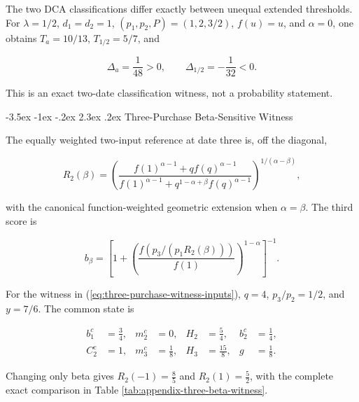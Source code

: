 \documentclass[12pt,a4paper,oneside]{report}
\makeatletter
\renewcommand\section{\@startsection{section}{1}{\z@}%
  {-3.5ex \@plus -1ex \@minus -.2ex}%
  {2.3ex \@plus .2ex}%
  {\normalfont\fontsize{14}{17}\selectfont\bfseries}}
\makeatother
\begin{document}
The two DCA classifications differ exactly between unequal extended
thresholds. For
$\lambda=1/2$, $d_1=d_2=1$, $(p_1,p_2,P)=(1,2,3/2)$,
$f(u)=u$, and $\alpha=0$, one obtains
$T_a=10/13$, $T_{1/2}=5/7$, and

\begin{equation}
  \Delta_a=\frac1{48}>0,
  \qquad
  \Delta_{1/2}=-\frac1{32}<0.
  \label{eq:appendix-two-flip}
\end{equation}

This is an exact two-date classification witness, not a probability statement.

\section{Three-Purchase Beta-Sensitive Witness}
\label{sec:appendix-three-purchase}

The equally weighted two-input reference at date three is, off the diagonal,

\begin{equation}
  R_2(\beta)=
  \left(
  \frac{f(1)^{\alpha-1}+qf(q)^{\alpha-1}}
       {f(1)^{\alpha-1}+q^{1-\alpha+\beta}f(q)^{\alpha-1}}
  \right)^{1/(\alpha-\beta)},
  \label{eq:appendix-three-reference}
\end{equation}

with the canonical function-weighted geometric extension when
$\alpha=\beta$. The third score is

\begin{equation}
  b_\beta=\left[1+
  \left(\frac{f(p_3/(p_1R_2(\beta)))}{f(1)}\right)^{1-\alpha}
  \right]^{-1}.
  \label{eq:appendix-three-score}
\end{equation}

For the witness in (\ref{eq:three-purchase-witness-inputs}), $q=4$,
$p_3/p_2=1/2$, and $y=7/6$. The common state is

\begin{equation}
  \begin{aligned}
    b_1^c&=\frac34, & m_2^c&=0, & H_2&=\frac54,
      & b_2^c&=\frac14,\\
    C_2^c&=1, & m_3^c&=\frac18, & H_3&=\frac{15}{8},
      & g&=\frac18.
  \end{aligned}
  \label{eq:appendix-three-common-state}
\end{equation}

Changing only beta gives $R_2(-1)=\frac85$ and
$R_2(1)=\frac52$, with the complete exact comparison in
Table \ref{tab:appendix-three-beta-witness}.
\end{document}
